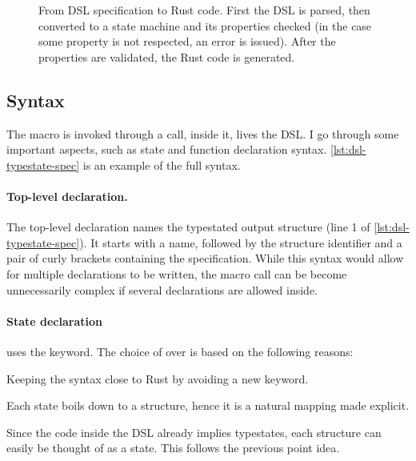 \begin{figure}
    \caption{
        From DSL specification to Rust code.
        First the DSL is parsed, then converted to a state machine and its properties checked
        (in the case some property is not respected, an error is issued).
        After the properties are validated, the Rust code is generated.
    }
    \label{fig:dsl-processing}
\end{figure}

\subsection{Syntax}

The macro is invoked through a  call, inside it, lives the DSL.
I go through some important aspects, such as state and function declaration syntax.
\autoref{lst:dsl-typestate-spec} is an example of the full syntax.

\paragraph{Top-level declaration.} The top-level declaration names the typestated output structure (line 1 of \autoref{lst:dsl-typestate-spec}).
It starts with a name, followed by the structure identifier and a pair of curly brackets containing the specification.
While this syntax would allow for multiple declarations to be written,
the macro call can be become unnecessarily complex if several declarations are allowed inside.

\paragraph{State declaration} uses the  keyword.
The choice of  over  is based on the following reasons:
\begin{compactitem}
    \item Keeping the syntax close to Rust by avoiding a new keyword.
    \item Each state boils down to a structure, hence it is a natural mapping made explicit.
    \item Since the code inside the DSL already implies typestates, each structure can easily be thought of as a state.
    This follows the previous point idea.
\end{compactitem}

